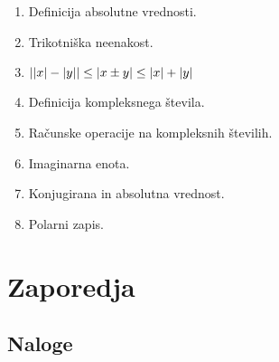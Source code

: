 \documentclass[a4paper,12pt]{report}
\begin{document}
\begin{enumerate}
    \item Definicija absolutne vrednosti.
    \item Trikotniška neenakost.
    \item $\abs{\abs{x} - \abs{y}} \leq \abs{x \pm y} \leq \abs{x} + \abs{y}$
    \item Definicija kompleksnega števila.
    \item Računske operacije na kompleksnih številih.
    \item Imaginarna enota.
    \item Konjugirana in absolutna vrednost.
    \item Polarni zapis.
\end{enumerate}


\chapter{Zaporedja}

\section*{Naloge}
\end{document}
